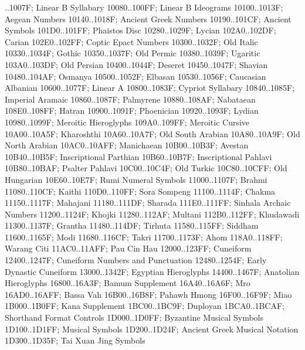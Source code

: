 ..1007F; Linear B Syllabary
10080..100FF; Linear B Ideograms
10100..1013F; Aegean Numbers
10140..1018F; Ancient Greek Numbers
10190..101CF; Ancient Symbols
101D0..101FF; Phaistos Disc
10280..1029F; Lycian
102A0..102DF; Carian
102E0..102FF; Coptic Epact Numbers
10300..1032F; Old Italic
10330..1034F; Gothic
10350..1037F; Old Permic
10380..1039F; Ugaritic
103A0..103DF; Old Persian
10400..1044F; Deseret
10450..1047F; Shavian
10480..104AF; Osmanya
10500..1052F; Elbasan
10530..1056F; Caucasian Albanian
10600..1077F; Linear A
10800..1083F; Cypriot Syllabary
10840..1085F; Imperial Aramaic
10860..1087F; Palmyrene
10880..108AF; Nabataean
108E0..108FF; Hatran
10900..1091F; Phoenician
10920..1093F; Lydian
10980..1099F; Meroitic Hieroglyphs
109A0..109FF; Meroitic Cursive
10A00..10A5F; Kharoshthi
10A60..10A7F; Old South Arabian
10A80..10A9F; Old North Arabian
10AC0..10AFF; Manichaean
10B00..10B3F; Avestan
10B40..10B5F; Inscriptional Parthian
10B60..10B7F; Inscriptional Pahlavi
10B80..10BAF; Psalter Pahlavi
10C00..10C4F; Old Turkic
10C80..10CFF; Old Hungarian
10E60..10E7F; Rumi Numeral Symbols
11000..1107F; Brahmi
11080..110CF; Kaithi
110D0..110FF; Sora Sompeng
11100..1114F; Chakma
11150..1117F; Mahajani
11180..111DF; Sharada
111E0..111FF; Sinhala Archaic Numbers
11200..1124F; Khojki
11280..112AF; Multani
112B0..112FF; Khudawadi
11300..1137F; Grantha
11480..114DF; Tirhuta
11580..115FF; Siddham
11600..1165F; Modi
11680..116CF; Takri
11700..1173F; Ahom
118A0..118FF; Warang Citi
11AC0..11AFF; Pau Cin Hau
12000..123FF; Cuneiform
12400..1247F; Cuneiform Numbers and Punctuation
12480..1254F; Early Dynastic Cuneiform
13000..1342F; Egyptian Hieroglyphs
14400..1467F; Anatolian Hieroglyphs
16800..16A3F; Bamum Supplement
16A40..16A6F; Mro
16AD0..16AFF; Bassa Vah
16B00..16B8F; Pahawh Hmong
16F00..16F9F; Miao
1B000..1B0FF; Kana Supplement
1BC00..1BC9F; Duployan
1BCA0..1BCAF; Shorthand Format Controls
1D000..1D0FF; Byzantine Musical Symbols
1D100..1D1FF; Musical Symbols
1D200..1D24F; Ancient Greek Musical Notation
1D300..1D35F; Tai Xuan Jing Symbols
